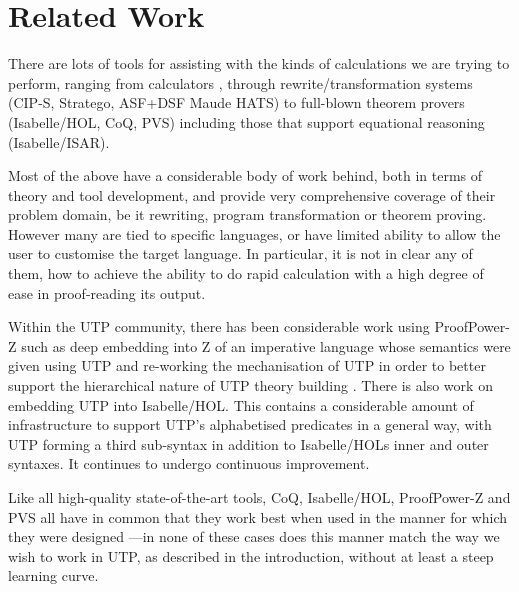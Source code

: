 \section{Related Work}\label{sec:Related}

There are lots of tools for assisting with the kinds of
calculations we are trying to perform,
ranging from calculators
\cite{Bird14},
through rewrite/transformation
systems
(CIP-S\cite{DBLP:books/sp/BauerEH87},
Stratego\cite{conf/rta/Visser01},
ASF+DSF\cite{VanDenBrand:2002:CLD}
Maude\cite{conf/rta/ClavelDELMMT03}
HATS\cite{conf/gttse/WinterB06})
to full-blown theorem provers
(Isabelle/HOL\cite{books/sp/NipkowPW02},
CoQ\cite{bk:Coq'Art:04},
PVS\cite{conf/fmcad/Shankar96})
including those that support equational reasoning
(Isabelle/ISAR\cite{man:Isabelle:Isar:Wenzel:10}).

Most of the above have a considerable body of work behind,
both in terms of theory and tool development,
and provide very comprehensive coverage of their problem domain,
be it rewriting, program transformation or theorem proving.
However many are tied to specific languages,
or have limited ability to allow the user to customise the target language.
In particular,
it is not in clear any of them,
how to achieve the ability to do rapid calculation
with a high degree of ease in proof-reading its
output.

Within the UTP community,
there has been considerable work using Proof{\-}Power-Z
such as deep embedding into Z of an imperative language whose semantics
were given using UTP \cite{conf/utp/NukaW06}and
 re-working the mechanisation of UTP in order to better support
the hierarchical nature of UTP theory building \cite{journals/entcs/ZeydaC09}.
%
There is also work on embedding UTP into Isabelle/HOL\cite{DBLP:conf/utp/FosterZW14}.
This contains a considerable amount of infrastructure to support UTP's
alphabetised predicates in a general way, with UTP forming a third
sub-syntax in addition to Isabelle/HOLs inner and outer syntaxes.
It continues to undergo continuous improvement\cite{DBLP:series/natosec/FosterW15}.

Like all high-quality state-of-the-art tools, CoQ, Isabelle/HOL, ProofPower-Z and PVS
all have in common that they work best when used in the manner
for which they were designed%
---in none of these cases does this manner match the way
we wish to work in UTP, as described in the introduction,
without at least a steep learning curve.



